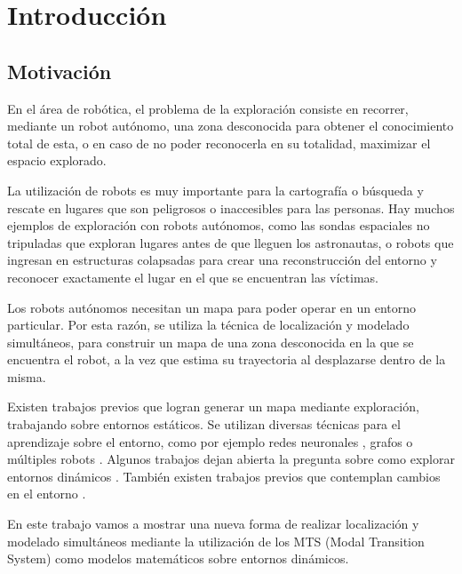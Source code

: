 \chapter{Introducción}

\section{Motivación}

En el área de robótica, el problema de la exploración consiste en recorrer, mediante un robot autónomo, una zona 
desconocida para obtener el conocimiento total de esta, o en caso de no poder reconocerla en su totalidad, maximizar 
el espacio explorado. 

\vspace{\baselineskip}
La utilización de robots es muy importante para la cartografía o búsqueda y rescate en lugares que son peligrosos o 
inaccesibles para las personas. Hay muchos ejemplos de exploración con robots autónomos, como las sondas espaciales 
no tripuladas que exploran lugares antes de que lleguen los astronautas, o robots que ingresan en estructuras colapsadas 
para crear una reconstrucción del entorno y reconocer exactamente el lugar en el que se encuentran las víctimas.

\vspace{\baselineskip}
Los robots autónomos necesitan un mapa para poder operar en un entorno particular. Por esta razón, se utiliza la técnica 
de localización y modelado simultáneos, para construir un mapa de una zona desconocida en la que se encuentra el robot, 
a la vez que estima su trayectoria al desplazarse dentro de la misma.

\vspace{\baselineskip}
Existen trabajos previos que logran generar un mapa mediante exploración, trabajando sobre entornos estáticos. 
Se utilizan diversas técnicas para el aprendizaje sobre el entorno, como por ejemplo redes neuronales \cite{TP2}, 
grafos \cite{TP4} o múltiples robots \cite{TP5}. Algunos trabajos dejan abierta la pregunta sobre como explorar 
entornos dinámicos \cite{TP1} \cite{TP3}. También existen trabajos previos que contemplan cambios en el entorno \cite{TP6}.

\vspace{\baselineskip}
En este trabajo vamos a mostrar una nueva forma de realizar localización y modelado simultáneos mediante la utilización 
de los MTS (Modal Transition System) como modelos matemáticos sobre entornos dinámicos.

